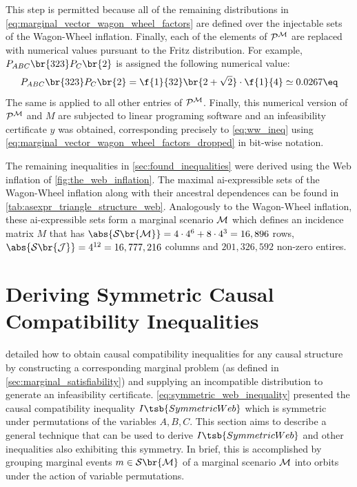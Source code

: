\documentclass[aps, 10pt, english, twoside, pra, nofootinbib, tightenlines, longbibliography, superscriptaddress]{revtex4-1}
\renewcommand{\Events}[1]{\mathcal{S}\br{#1}} %
\begin{document}
    This step is permitted because all of the remaining distributions in \cref{eq:marginal_vector_wagon_wheel_factors} are defined over the injectable sets of the Wagon-Wheel inflation. Finally, each of the elements of $\probvec^{\mscenario}$ are replaced with numerical values pursuant to the Fritz distribution. For example, $\prob[ABC]\br{323}\prob[C]\br{2}$ is assigned the following numerical value:
    \[ \prob[ABC]\br{323}\prob[C]\br{2} = \f{1}{32}\br{2 + \sqrt{2}} \cdot \f{1}{4} \simeq 0.0267 \eq \]
    The same is applied to all other entries of $\probvec^{\mscenario}$. Finally, this numerical version of $\probvec^{\mscenario}$ and $M$ are subjected to linear programing software and an infeasibility certificate $y$ was obtained, corresponding precisely to \cref{eq:ww_ineq} using \cref{eq:marginal_vector_wagon_wheel_factors_dropped} in bit-wise notation.

    The remaining inequalities in \cref{sec:found_inequalities} were derived using the Web inflation of \cref{fig:the_web_inflation}. The maximal ai-expressible sets of the Wagon-Wheel inflation along with their ancestral dependences can be found in \cref{tab:asexpr_triangle_structure_web}. Analogously to the Wagon-Wheel inflation, these ai-expressible sets form a marginal scenario $\mathcal{M}$ which defines an incidence matrix $M$ that has $\abs{\Events{\mscenario}} = 4 \cdot 4^{6} + 8 \cdot 4^3 = 16,896$ rows, $\abs{\Events{\jointvar}} = 4^{12} = 16,777,216$ columns and $201,326,592$ non-zero entires.

    \section{Deriving Symmetric Causal Compatibility Inequalities}
    \label{sec:symmetric_inequalities}

     detailed how to obtain causal compatibility inequalities for any causal structure by constructing a corresponding marginal problem (as defined in \cref{sec:marginal_satisfiability}) and supplying an incompatible distribution to generate an infeasibility certificate. \cref{eq:symmetric_web_inequality} presented the causal compatibility inequality $I\tsb{SymmetricWeb}$ which is symmetric under permutations of the variables $A,B,C$. This section aims to describe a general technique that can be used to derive  $I\tsb{SymmetricWeb}$ and other inequalities also exhibiting this symmetry. In brief, this is accomplished by grouping marginal events $m \in \Events{\mscenario}$ of a marginal scenario $\mathcal{M}$ into orbits under the action of variable permutations.
\end{document}
